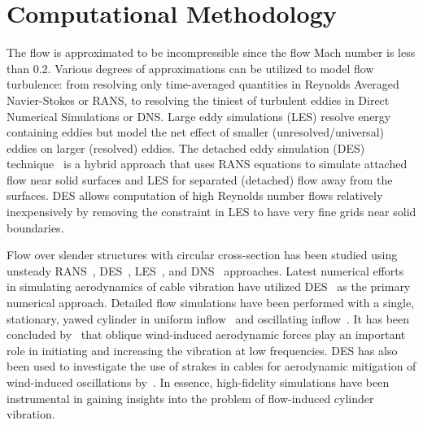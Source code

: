 \documentclass[12pt,authoryear]{elsarticle}
\begin{document}
\section{Computational Methodology}
\label{sec:methodology}
%
The flow is approximated to be incompressible since the flow Mach number is
less than $0.2$. Various degrees of approximations can be utilized to model
flow turbulence: from resolving only time-averaged quantities in Reynolds
Averaged Navier-Stokes or RANS, to resolving the tiniest of turbulent eddies in
Direct Numerical Simulations or DNS. Large eddy simulations (LES) resolve
energy containing eddies but model the net effect of smaller
(unresolved/universal) eddies on larger (resolved) eddies. The detached eddy
simulation (DES) technique~\citep{spalart1997comments} is a hybrid approach
that uses RANS equations to simulate attached flow near solid surfaces and LES
for separated (detached) flow away from the surfaces. DES allows computation of
high Reynolds number flows relatively inexpensively by removing the constraint
in LES to have very fine grids near solid boundaries.

Flow over slender structures with circular cross-section has been studied using
unsteady RANS~\citep{pontaza2009three},
DES~\citep{travin2000detached,yeo2012aerodynamic},
LES~\citep{breuer1998large,kravchenko2000numerical,catalano2003numerical}, and
DNS~\citep{dong2005dns,zhao2009direct} approaches. Latest numerical efforts in
simulating aerodynamics of cable vibration have utilized
DES~\citep{yeo2007characteristics,yeo2008investigation,yeo2012aerodynamic,yeo2011computational}
as the primary numerical approach. Detailed flow simulations have been
performed with a single, stationary, yawed cylinder in uniform
inflow~\citep{yeo2007characteristics,yeo2008investigation} and oscillating
inflow~\citep{yeo2012aerodynamic}. It has been concluded
by~\cite{yeo2012aerodynamic} that oblique wind-induced aerodynamic forces play
an important role in initiating and increasing the vibration at low
frequencies. DES has also been used to investigate the use of strakes in cables
for aerodynamic mitigation of wind-induced oscillations
by~\cite{yeo2011computational}. In essence, high-fidelity simulations have been
instrumental in gaining insights into the problem of flow-induced cylinder
vibration.
\end{document}
